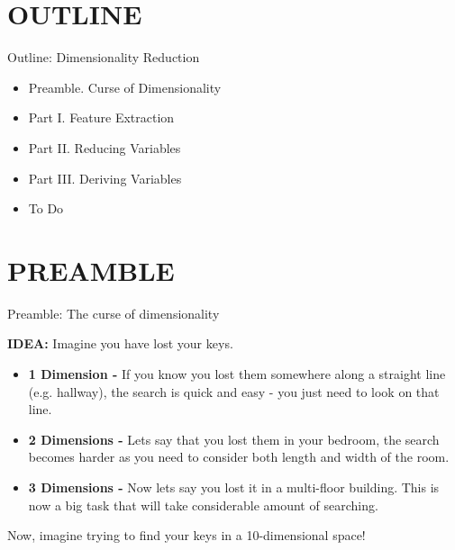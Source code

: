 \documentclass[handout]{beamer}
\begin{document}
\section*{OUTLINE}
\begin{frame}{Outline: Dimensionality Reduction}
\begin{itemize}

\item[] Preamble. Curse of Dimensionality
\item[] Part I. Feature Extraction
\item[] Part II. Reducing Variables
\item[] Part III. Deriving Variables
\vspace*{0.3cm}
\item To Do
\end{itemize}
\end{frame}
\section{PREAMBLE}

\begin{frame}{Preamble: The curse of dimensionality}

\textbf{IDEA:} Imagine you have lost your keys.  
\begin{itemize}
    \item \textbf{1 Dimension -} If you know you lost them somewhere along a straight line (e.g. hallway), the search is quick and easy - you just need to look on that line.
    \item \textbf{2 Dimensions -} Lets say that you lost them in your bedroom, the search becomes harder as you need to consider both length and width of the room.
    \item \textbf{3 Dimensions -} Now lets say you lost it in a multi-floor building. This is now a big task that will take considerable amount of searching.
\end{itemize} 
Now, imagine trying to find your keys in a 10-dimensional space! 
\end{frame}
\end{document}
